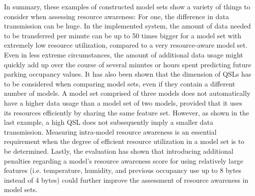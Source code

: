 In summary, these examples of constructed model sets show a variety of things to consider when assessing resource awareness: For one, the difference in data transmission can be huge. In the implemented system, the amount of data needed to be transferred per minute can be up to 50 times bigger for a model set with extremely low resource utilization, compared to a very resource-aware model set. Even in less extreme circumstances, the amount of additional data usage might quickly add up over the course of several minutes or hours spent predicting future parking occupancy values. It has also been shown that the dimension of QSLs has to be considered when comparing model sets, even if they contain a different number of models. A model set comprised of three models does not automatically have a higher data usage than a model set of two models, provided that it uses its resources efficiently by sharing the same feature set. However, as shown in the last example, a high QSL does not subsequently imply a smaller data transmission. Measuring intra-model resource awareness is an essential requirement when the degree of efficient resource utilization in a model set is to be determined. Lastly, the evaluation has shown that introducing additional penalties regarding a model’s resource awareness score for using relatively large features (i.e. temperature, humidity, and previous occupancy use up to 8 bytes instead of 4 bytes) could further improve the assessment of resource awareness in model sets. 
